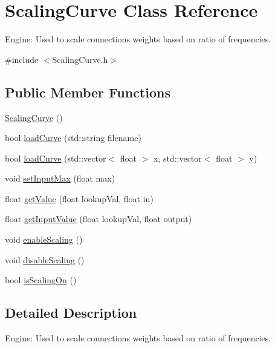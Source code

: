 \hypertarget{classScalingCurve}{}\section{Scaling\+Curve Class Reference}
\label{classScalingCurve}


Engine\+: Used to scale connections weights based on ratio of frequencies.  




{\ttfamily \#include $<$Scaling\+Curve.\+h$>$}

\subsection*{Public Member Functions}
\begin{DoxyCompactItemize}
\item 
\hyperlink{classScalingCurve_ab0b52e98eecd1c1ce1ff888dc710ebbc}{Scaling\+Curve} ()
\item 
bool \hyperlink{classScalingCurve_af8657e5cc68d011c0ff6c7dba0fb6747}{load\+Curve} (std\+::string filename)
\item 
bool \hyperlink{classScalingCurve_a834725ff8c4c7763df12fb1c8a3010e1}{load\+Curve} (std\+::vector$<$ float $>$ x, std\+::vector$<$ float $>$ y)
\item 
void \hyperlink{classScalingCurve_a95c549a2017ba588478026e95c7198bd}{set\+Input\+Max} (float max)
\item 
float \hyperlink{classScalingCurve_a779ba1c1e433d8ab08eaabc4633927c8}{get\+Value} (float lookup\+Val, float in)
\item 
float \hyperlink{classScalingCurve_a3259fbbbbf323b36b899bc1a67896a5a}{get\+Input\+Value} (float lookup\+Val, float output)
\item 
void \hyperlink{classScalingCurve_a902a8b226db6f165874875d84cdefef5}{enable\+Scaling} ()
\item 
void \hyperlink{classScalingCurve_a688204d455d320f7ac5435c60e815772}{disable\+Scaling} ()
\item 
bool \hyperlink{classScalingCurve_aa76648ce8ad5f0cb1676ac251b17599f}{is\+Scaling\+On} ()
\end{DoxyCompactItemize}


\subsection{Detailed Description}
Engine\+: Used to scale connections weights based on ratio of frequencies. 

